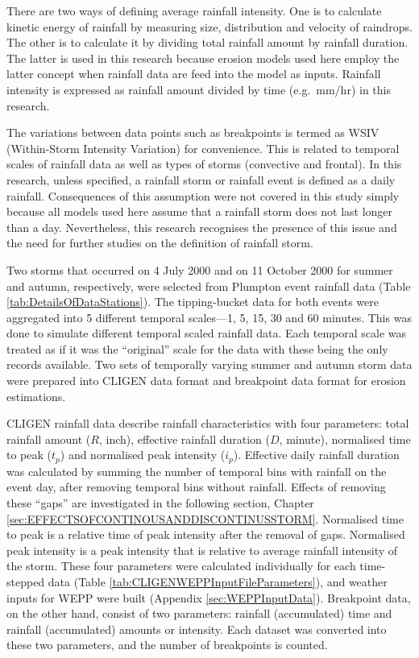 There are two ways of defining average rainfall intensity. One is to calculate
kinetic energy of rainfall by measuring size, distribution and velocity of
raindrops. The other is to calculate it by dividing total rainfall amount by
rainfall duration. The latter is used in this research because erosion models
used here employ the latter concept when rainfall data are feed into the model
as inputs. Rainfall intensity is expressed as rainfall amount divided by time
(e.g.\ mm/hr) in this research.

The variations between data points such as breakpoints is termed as WSIV
(Within-Storm Intensity Variation) for convenience. This is related to temporal
scales of rainfall data as well as types of storms (convective and frontal). In
this research, unless specified, a rainfall storm or rainfall event is defined
as a daily rainfall. Consequences of this assumption were not covered in this
study simply because all models used here assume that a rainfall storm does not
last longer than a day. Nevertheless, this research recognises the presence
of this issue and the need for further studies on the definition of rainfall
storm.

Two storms that occurred on 4 July 2000 and on 11 October 2000 for summer and
autumn, respectively, were selected from Plumpton event rainfall data (Table
\ref{tab:DetailsOfDataStations}). 
The tipping-bucket data for both events were aggregated into 5 different
temporal scales---1, 5, 15, 30 and 60 minutes. This was done to simulate
different temporal scaled rainfall data. Each temporal scale was treated as if
it was the ``original'' scale for the data with these being the only records
available. Two sets of temporally varying summer and autumn storm data were
prepared into CLIGEN data format and breakpoint data format for erosion
estimations.

CLIGEN rainfall data describe rainfall characteristics with four parameters:
total rainfall amount ($R$, inch), effective rainfall duration ($D$, minute),
normalised time to peak ($t_p$) and normalised peak intensity ($i_p$). Effective
daily rainfall duration was calculated by summing the number of temporal bins
with rainfall on the event day, after removing temporal bins without rainfall.
Effects of removing these ``gaps'' are investigated in the following section,
Chapter \ref{sec:EFFECTSOFCONTINOUSANDDISCONTINUSSTORM}. Normalised time to
peak is a relative time of peak intensity after the removal of gaps.
Normalised peak intensity is a peak intensity that is relative to average
rainfall intensity of the storm. These four parameters were calculated
individually for each time-stepped data (Table
\ref{tab:CLIGENWEPPInputFileParameters}), and weather inputs for WEPP were
built (Appendix \ref{sec:WEPPInputData}). Breakpoint data, on the other hand,
consist of two parameters: rainfall (accumulated) time and rainfall
(accumulated) amounts or intensity. Each dataset was converted into these two
parameters, and the number of breakpoints is counted.

